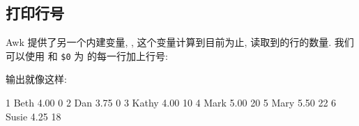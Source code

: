 \subsection{打印行号}
\label{subsec:printing_line_numbers}

Awk 提供了另一个内建变量, \NR, 这个变量计算到目前为止, 读取到的行的数量.
我们可以使用 \NR 和 \verb'$0' 为  的每一行加上行号:
输出就像这样:
\begin{file}
    1 Beth    4.00    0
    2 Dan     3.75    0
    3 Kathy   4.00    10
    4 Mark    5.00    20
    5 Mary    5.50    22
    6 Susie   4.25    18
\end{file}

